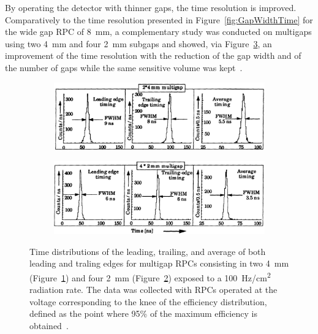 	By operating the detector with thinner gaps, the time resolution is improved. Comparatively to the time resolution presented in Figure~\ref{fig:GapWidthTime} for the wide gap RPC of \SI{8}{mm}, a complementary study was conducted on multigaps using two \SI{4}{mm} and four \SI{2}{mm} subgaps and showed, via Figure~\ref{fig:MRPCTimeRes}, an improvement of the time resolution with the reduction of the gap width and of the number of gaps while the same sensitive volume was kept~\cite{WILLIAMS98}.
	
	\begin{figure}[H]
		\begin{subfigure}{\linewidth}
			\centering
			\includegraphics[width = \plotwidth]{fig/chapt4/MRPC-2-4mm-time-res.png}
			\caption{\label{fig:MRPCTimeRes:A}}
		\end{subfigure}
		\begin{subfigure}{\linewidth}
			\centering
			\includegraphics[width = \plotwidth]{fig/chapt4/MRPC-4-2mm-time-res.png}
			\caption{\label{fig:MRPCTimeRes:B}}
		\end{subfigure}
		\caption{\label{fig:MRPCTimeRes} Time distributions of the leading, trailing, and average of both leading and traling edges for multigap RPCs consisting in two \SI{4}{mm} (Figure~\ref{fig:MRPCTimeRes:A}) and four \SI{2}{mm} (Figure~\ref{fig:MRPCTimeRes:B}) exposed to a \SI{100}{Hz/cm^2} radiation rate. The data was collected with RPCs operated at the voltage corresponding to the knee of the efficiency distribution, defined as the point where 95\% of the maximum efficiency is obtained~\cite{WILLIAMS98}.}
	\end{figure}
	
